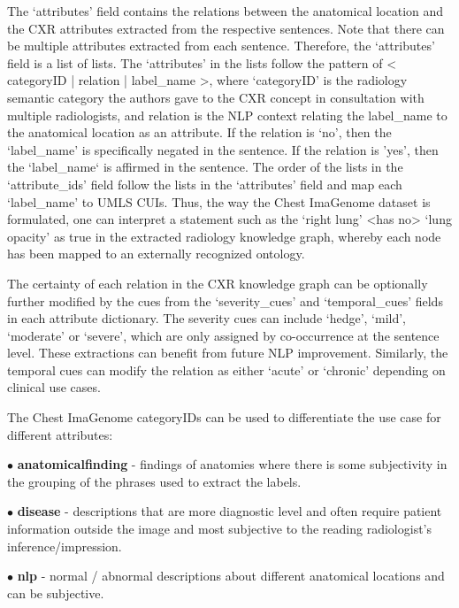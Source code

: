 The `attributes' field contains the relations between the anatomical location and the CXR attributes extracted from the respective sentences. Note that there can be multiple attributes extracted from each sentence. Therefore, the `attributes' field is a list of lists. The `attributes' in the lists follow the pattern of < categoryID | relation | label\_name >, where `categoryID' is the radiology semantic category the authors gave to the CXR concept in consultation with multiple radiologists, and relation is the NLP context relating the label\_name to the anatomical location as an attribute. If the relation is `no', then the `label\_name' is specifically negated in the sentence. If the relation is 'yes', then the `label\_name` is affirmed in the sentence. The order of the lists in the `attribute\_ids' field follow the lists in the `attributes' field and map each `label\_name' to UMLS CUIs. Thus, the way the Chest ImaGenome dataset is formulated, one can interpret a statement such as the `right lung' <has no> `lung opacity' as true in the extracted radiology knowledge graph, whereby each node has been mapped to an externally recognized ontology. 

The certainty of each relation in the CXR knowledge graph can be optionally further modified by the cues from the `severity\_cues' and `temporal\_cues' fields in each attribute dictionary. The severity cues can include `hedge', `mild', `moderate' or `severe', which are only assigned by co-occurrence at the sentence level. These extractions can benefit from future NLP improvement. Similarly, the temporal cues can modify the relation as either `acute' or `chronic' depending on clinical use cases.

The Chest ImaGenome categoryIDs can be used to differentiate the use case for different attributes:

$\bullet$ \textbf{anatomicalfinding} - findings of anatomies where there is some subjectivity in the grouping of the phrases used to extract the labels.
\vspace{-2pt}

$\bullet$ \textbf{disease} - descriptions that are more diagnostic level and often require patient information outside the image and most subjective to the reading radiologist's inference/impression.
\vspace{-2pt}

$\bullet$ \textbf{nlp} - normal / abnormal descriptions about different anatomical locations and can be subjective.
\vspace{-2pt}

